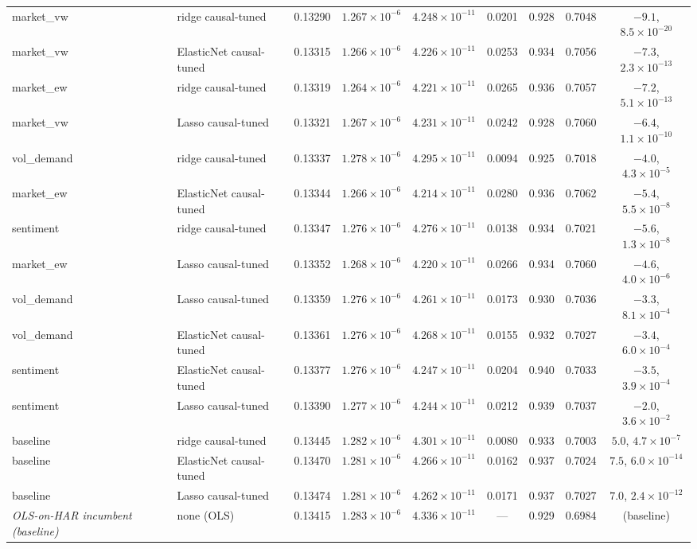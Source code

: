 \begin{table}[t]
\begin{tabular}{@{}llccccccc@{}}
market\_vw & ridge causal-tuned & 0.13290 & $1.267 \times 10^{-6}$ & $4.248 \times 10^{-11}$ & 0.0201 & 0.928 & 0.7048 & $-9.1$, $8.5 \times 10^{-20}$ \\
market\_vw & ElasticNet causal-tuned & 0.13315 & $1.266 \times 10^{-6}$ & $4.226 \times 10^{-11}$ & 0.0253 & 0.934 & 0.7056 & $-7.3$, $2.3 \times 10^{-13}$ \\
market\_ew & ridge causal-tuned & 0.13319 & $1.264 \times 10^{-6}$ & $4.221 \times 10^{-11}$ & 0.0265 & 0.936 & 0.7057 & $-7.2$, $5.1 \times 10^{-13}$ \\
market\_vw & Lasso causal-tuned & 0.13321 & $1.267 \times 10^{-6}$ & $4.231 \times 10^{-11}$ & 0.0242 & 0.928 & 0.7060 & $-6.4$, $1.1 \times 10^{-10}$ \\
vol\_demand & ridge causal-tuned & 0.13337 & $1.278 \times 10^{-6}$ & $4.295 \times 10^{-11}$ & 0.0094 & 0.925 & 0.7018 & $-4.0$, $4.3 \times 10^{-5}$ \\
market\_ew & ElasticNet causal-tuned & 0.13344 & $1.266 \times 10^{-6}$ & $4.214 \times 10^{-11}$ & 0.0280 & 0.936 & 0.7062 & $-5.4$, $5.5 \times 10^{-8}$ \\
sentiment & ridge causal-tuned & 0.13347 & $1.276 \times 10^{-6}$ & $4.276 \times 10^{-11}$ & 0.0138 & 0.934 & 0.7021 & $-5.6$, $1.3 \times 10^{-8}$ \\
market\_ew & Lasso causal-tuned & 0.13352 & $1.268 \times 10^{-6}$ & $4.220 \times 10^{-11}$ & 0.0266 & 0.934 & 0.7060 & $-4.6$, $4.0 \times 10^{-6}$ \\
vol\_demand & Lasso causal-tuned & 0.13359 & $1.276 \times 10^{-6}$ & $4.261 \times 10^{-11}$ & 0.0173 & 0.930 & 0.7036 & $-3.3$, $8.1 \times 10^{-4}$ \\
vol\_demand & ElasticNet causal-tuned & 0.13361 & $1.276 \times 10^{-6}$ & $4.268 \times 10^{-11}$ & 0.0155 & 0.932 & 0.7027 & $-3.4$, $6.0 \times 10^{-4}$ \\
sentiment & ElasticNet causal-tuned & 0.13377 & $1.276 \times 10^{-6}$ & $4.247 \times 10^{-11}$ & 0.0204 & 0.940 & 0.7033 & $-3.5$, $3.9 \times 10^{-4}$ \\
sentiment & Lasso causal-tuned & 0.13390 & $1.277 \times 10^{-6}$ & $4.244 \times 10^{-11}$ & 0.0212 & 0.939 & 0.7037 & $-2.0$, $3.6 \times 10^{-2}$ \\
baseline & ridge causal-tuned & 0.13445 & $1.282 \times 10^{-6}$ & $4.301 \times 10^{-11}$ & 0.0080 & 0.933 & 0.7003 & $5.0$, $4.7 \times 10^{-7}$ \\
baseline & ElasticNet causal-tuned & 0.13470 & $1.281 \times 10^{-6}$ & $4.266 \times 10^{-11}$ & 0.0162 & 0.937 & 0.7024 & $7.5$, $6.0 \times 10^{-14}$ \\
baseline & Lasso causal-tuned & 0.13474 & $1.281 \times 10^{-6}$ & $4.262 \times 10^{-11}$ & 0.0171 & 0.937 & 0.7027 & $7.0$, $2.4 \times 10^{-12}$ \\
\emph{OLS-on-HAR incumbent (baseline)} & none (OLS) & 0.13415 & $1.283 \times 10^{-6}$ & $4.336 \times 10^{-11}$ & --- & 0.929 & 0.6984 & (baseline) \\
\bottomrule
\end{tabular}
\end{table}
